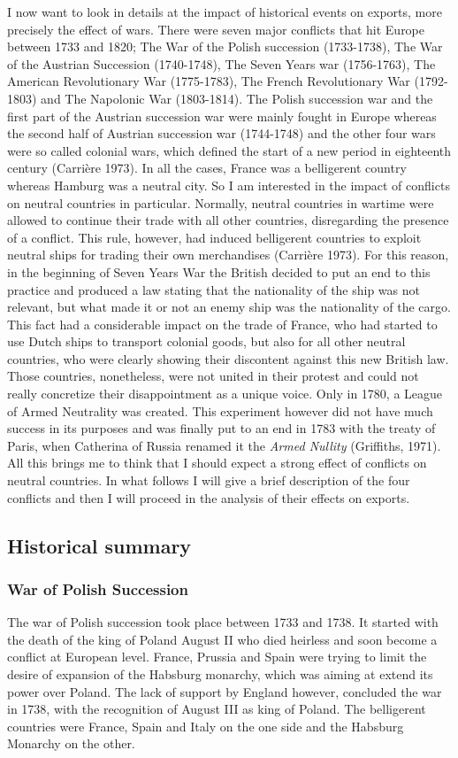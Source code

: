 \documentclass[12pt,a4paper,titlepage]{article}
\begin{document}
I now want to look in details at the impact of historical events on exports, more precisely the effect of wars. There were seven major conflicts that hit Europe between 1733 and 1820; The War of the Polish succession (1733-1738), The War of the Austrian Succession (1740-1748), The Seven Years war (1756-1763), The American Revolutionary War (1775-1783), The French Revolutionary War (1792-1803) and The Napolonic War (1803-1814). The Polish succession war and the first part of the Austrian succession war were mainly fought in Europe whereas the second half of Austrian succession war (1744-1748) and the other four wars were so called colonial wars, which defined the start of a new period in eighteenth century (Carrière 1973). In all the cases, France was a belligerent country whereas Hamburg was a neutral city. So I am interested in the impact of conflicts on neutral countries in particular. Normally, neutral countries in wartime were allowed to continue their trade with all other countries, disregarding the presence of a conflict.  This rule, however, had induced belligerent countries to exploit neutral ships for trading their own merchandises (Carrière 1973). For this reason, in the beginning of Seven Years War the British decided to put an end to this practice and produced a law stating that the nationality of the ship was not relevant, but what made it or not an enemy ship was the nationality of the cargo. This fact had a considerable impact on the trade of France, who had started to use Dutch ships to transport colonial goods, but also for all other neutral countries, who were clearly showing their discontent against this new British law. Those countries, nonetheless, were not united in their protest and could not really concretize their disappointment as a unique voice. Only in 1780, a League of Armed Neutrality was created. This experiment however did not have much success in its purposes and was finally put to an end in 1783 with the treaty of Paris, when Catherina of Russia renamed it the \textit{Armed Nullity} (Griffiths, 1971). 
All this brings me to think that I should expect a strong effect of conflicts on neutral countries. 
In what follows I will give a brief description of the four conflicts and then I will proceed in the analysis of their effects on exports. 

\subsection{Historical summary}
\subsubsection{War of Polish Succession}
The war of Polish succession took place between 1733 and 1738. It started with the death of the king of Poland August II who died heirless and soon become a conflict at European level. France, Prussia and Spain were trying to limit the desire of expansion of the Habsburg monarchy, which was aiming at extend its power over Poland. The lack of support by England however, concluded the war in 1738, with the recognition of August III as king of Poland. The belligerent countries were France, Spain and Italy on the one side and the Habsburg Monarchy on the other. 
\end{document}
